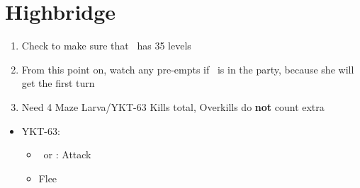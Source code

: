 \chapter{Highbridge}
\begin{spheregrid}
    \begin{itemize}
        \yunaf
    \end{itemize}
\end{spheregrid}
\begin{enumerate}
    \item Check to make sure that \lulu\ has 35 levels
    \item From this point on, watch any pre-empts if \yuna\ is in the party, because she will get the first turn
    \item Need 4 Maze Larva/YKT-63 Kills total, Overkills do \textbf{not} count extra
\end{enumerate}
\begin{encounters}
    \begin{itemize}
        \item YKT-63:
        \begin{itemize}
            \item \tidus\ or \yuna: Attack
            \item Flee
        \end{itemize}
    \end{itemize}
\end{encounters}
